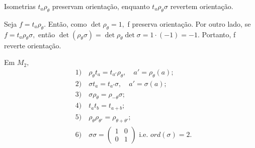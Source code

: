 \documentclass[algebra_notes.tex]{subfiles}
\begin{document}
\begin{crl*}
	Isometrias $t_{a}\rho_{\theta }$ preservam orientação, enquanto $t_{a}\rho_{\theta }\sigma $ revertem orientação.
\end{crl*}
\begin{proof*}
	Seja $f=t_{a}\rho_{\theta }.$ Então, como $\det{\rho_{\theta }} =1,$ f preserva orientação. Por outro lado, se $f=t_{a}\rho_{\theta }\sigma ,$
	então $\det{(\rho_{\theta }\sigma )} = \det{\rho_{\theta }}\det{\sigma } = 1 \cdot (-1) = -1.$ Portanto, f reverte orientação. \qedsymbol
\end{proof*}
\begin{crl*}
	Em $M_{2},$
	\begin{align*}
		 & 1)\quad \rho_{\theta }t_{a} = t_{a'}\rho_{\theta },\quad a'=\rho_{\theta }(a); \\
		 & 2)\quad \sigma t_{a} = t_{a'}\sigma , \quad a'= \sigma(a);                     \\
		 & 3)\quad \sigma \rho_{\theta } = \rho_{-\theta }\sigma;                         \\
		 & 4)\quad t_{a}t_{b} = t_{a+b};                                                  \\
		 & 5)\quad \rho_{\theta }\rho_{\theta '} = \rho_{\theta +\theta '};               \\
		 & 6)\quad \sigma \sigma = \begin{pmatrix}
			                           1 & 0 \\
			                           0 & 1
		                           \end{pmatrix}\text{ i.e. } ord(\sigma ) = 2.
	\end{align*}
\end{crl*}
\end{document}
